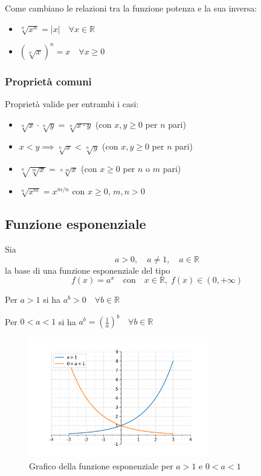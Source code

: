 Come cambiano le relazioni tra la funzione potenza e la sua inversa:
\begin{itemize}
\item $\sqrt[n]{x^n} = |x| \quad \forall x \in \mathbb{R}$
\item $(\sqrt[n]{x})^n = x \quad \forall x \geq 0$
\end{itemize}

\subsubsection{Proprietà comuni}
Proprietà valide per entrambi i casi:
\begin{itemize}
\item $\sqrt[n]{x} \cdot \sqrt[n]{y} = \sqrt[n]{x \cdot y}$ (con $x, y \geq 0$ per $n$ pari)
\item $x < y \implies \sqrt[n]{x} < \sqrt[n]{y}$ (con $x, y \geq 0$ per $n$ pari)
\item $\sqrt[n]{\sqrt[m]{x}} = \sqrt[n \cdot m]{x}$ (con $x \geq 0$ per $n$ o $m$ pari)
\item $\sqrt[n]{x^m} = x^{m/n}$ con $x \geq 0$, $m, n > 0$
\end{itemize}

\subsection{Funzione esponenziale}

Sia
\[
  a > 0, \quad a \neq 1, \quad a \in \mathbb{R}
\]
la base di una funzione esponenziale del tipo
\[
  f(x) = a^x \quad \text{con} \quad x \in \mathbb{R}, \; f(x) \in (0, +\infty)
\]

Per $a > 1$ si ha $a^b > 0 \quad \forall b \in \mathbb{R}$

Per $0 < a < 1$ si ha $a^b = \left(\frac{1}{a}\right)^b \quad \forall b \in \mathbb{R}$

\begin{figure}[H]
  \centering
  \includegraphics[width=0.7\textwidth]{./img/esponenziale.png}
  \caption{Grafico della funzione esponenziale per $a>1$ e $0<a<1$}
  \label{fig:funzione_esponenziale}
\end{figure}
\FloatBarrier

